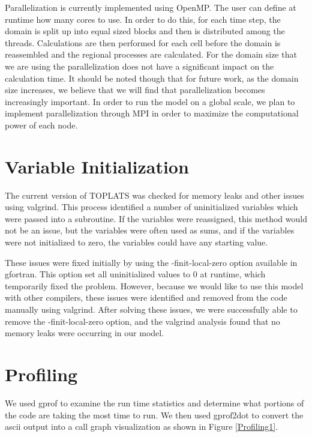 \documentclass[pdftex,12pt,a4paper]{article}
\begin{document}
Parallelization is currently implemented using OpenMP. The user can define at runtime how many cores to use. In order to do this, for each time step, the domain is split up into equal sized blocks and then is distributed among the threads. Calculations are then performed for each cell before the domain is reassembled and the regional processes are calculated. For the domain size that we are using the parallelization does not have a significant impact on the calculation time. It should be noted though that for future work, as the domain size increases, we believe that we will find that parallelization becomes increasingly important. In order to run the model on a global scale, we plan to implement parallelization through MPI in order to maximize the computational power of each node.

\section{Variable Initialization}
The current version of TOPLATS was checked for memory leaks and other issues using valgrind. This process identified a number of uninitialized variables which were passed into a subroutine. If the variables were reassigned, this method would not be an issue, but the variables were often used as sums, and if the variables were not initialized to zero, the variables could have any starting value. 

\vspace{1em}

These issues were fixed initially by using the -finit-local-zero option available in gfortran. This option set all uninitialized values to 0 at runtime, which temporarily fixed the problem. However, because we would like to use this model with other compilers, these issues were identified and removed from the code manually using valgrind. After solving these issues, we were successfully able to remove the -finit-local-zero option, and the valgrind analysis found that no memory leaks were occurring in our model.

\section{Profiling}

We used gprof to examine the run time statistics and determine what portions of the code are taking the most time to run. We then used gprof2dot to convert the ascii output into a call graph visualization as shown in Figure \ref{Profiling1}. 
\end{document}
